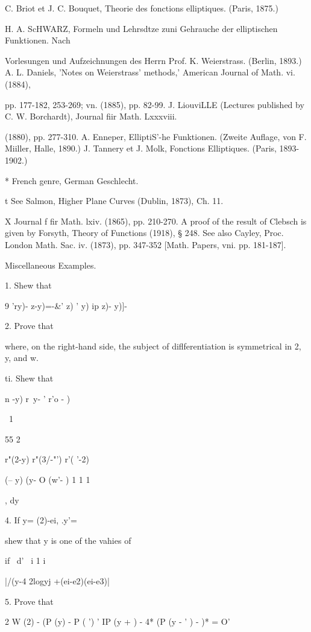 {C. Briot et J. C. Bouquet, Theorie des fonctions elliptiques. (Paris,
1875.)

H. A. ScHWARZ, Formeln und Lehrsdtze zuni Gehrauche der elliptischen
Funktionen. Nach

Vorlesungen und Aufzeichnungen des Herrn Prof. K. Weierstrass.
(Berlin, 1893.) A. L. Daniels, 'Notes on Weierstrass' methods,'
American Journal of Math. vi. (1884),

pp. 177-182, 253-269; vn. (1885), pp. 82-99. J. LiouviLLE (Lectures
published by C. W. Borchardt), Journal fiir Math. Lxxxviii.

(1880), pp. 277-310. A. Enneper, ElliptiS'-he Funktionen. (Zweite
Auflage, von F. Miiller, Halle, 1890.) J. Tannery et J. Molk,
Fonctions Elliptiques. (Paris, 1893-1902.)

* French genre, German Geschlecht.

t See Salmon, Higher Plane Curves (Dublin, 1873), Ch. 11.

X Journal f fir Math. lxiv. (1865), pp. 210-270. A proof of the result
of Clebsch is given by Forsyth, Theory of Functions (1918), § 248. See
also Cayley, Proc. London Math. Sac. iv. (1873), pp. 347-352 [Math.
Papers, vni. pp. 181-187].

%
%

Miscellaneous Examples.

1. Shew that

9 'ry)- z-y)=-\&' z) ' y) ip z)- y)]-\

2. Prove that

where, on the right-hand side, the subject of diflferentiation is
symmetrical in 2, y, and w.

 ti. Shew that

n -y) r\ y- ' r'o - )

\ 1

55 2

r"(2-y) r"(3/-"') r'( '-2)

  (-- y) (y- O (w'- ) 1 1 1

, dy

4. If y= (2)-ei, .y'=

shew that y is one of the vahies of

if \ d' \ i 1 i

|/(y-4 2logyj +(ei-e2)(ei-e3)|


5. Prove that

2 W (2) - (P (y) - P ( ') ' IP (y + ) - 4* (P (y - ' ) - )* = O'

}
